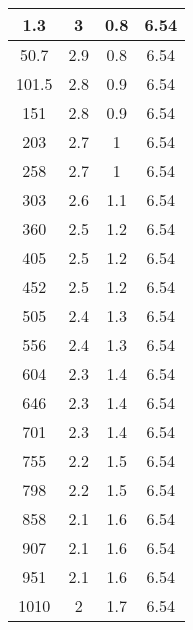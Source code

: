 \documentclass[12pt]{article}
\begin{document}
\begin{longtable}{|c|c|c|c|}
    
    1.3                     & 3                 & 0.8               & 6.54               \\ \hline
    50.7                    & 2.9               & 0.8               & 6.54               \\ \hline
    101.5                   & 2.8               & 0.9               & 6.54               \\ \hline
    151                     & 2.8               & 0.9               & 6.54               \\ \hline
    203                     & 2.7               & 1                 & 6.54               \\ \hline
    258                     & 2.7               & 1                 & 6.54               \\ \hline
    303                     & 2.6               & 1.1               & 6.54               \\ \hline
    360                     & 2.5               & 1.2               & 6.54               \\ \hline
    405                     & 2.5               & 1.2               & 6.54               \\ \hline
    452                     & 2.5               & 1.2               & 6.54               \\ \hline
    505                     & 2.4               & 1.3               & 6.54               \\ \hline
    556                     & 2.4               & 1.3               & 6.54               \\ \hline
    604                     & 2.3               & 1.4               & 6.54               \\ \hline
    646                     & 2.3               & 1.4               & 6.54               \\ \hline
    701                     & 2.3               & 1.4               & 6.54               \\ \hline
    755                     & 2.2               & 1.5               & 6.54               \\ \hline
    798                     & 2.2               & 1.5               & 6.54               \\ \hline
    858                     & 2.1               & 1.6               & 6.54               \\ \hline
    907                     & 2.1               & 1.6               & 6.54               \\ \hline
    951                     & 2.1               & 1.6               & 6.54               \\ \hline
    1010                    & 2                 & 1.7               & 6.54               \\ \hline

\end{longtable}
\end{document}

